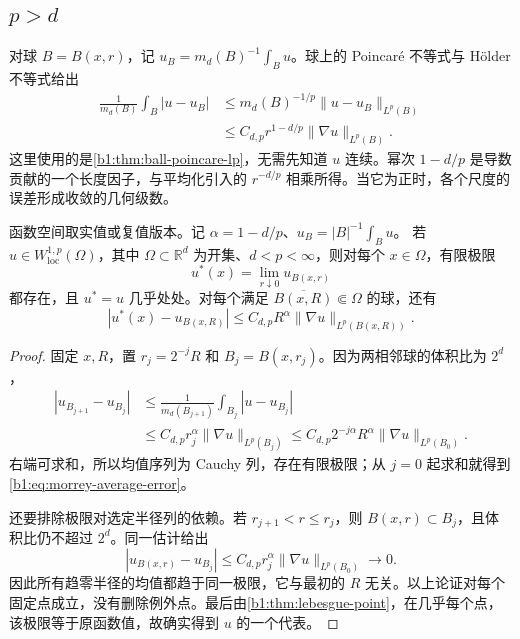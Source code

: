 \subsection{\texorpdfstring{\(p>d\)}{p>d}}
\label{b1:subsec:240301}

对球 \(B=B(x,r)\)，记 \(u_B=m_d(B)^{-1}\int_Bu\)。球上的 Poincaré 不等式与 Hölder 不等式给出
\begin{equation}\label{b1:eq:morrey-average-oscillation}
 \begin{split}
 \frac1{m_d(B)}\int_B|u-u_B|
 &\le m_d(B)^{-1/p}\|u-u_B\|_{L^p(B)}\\
 &\le C_{d,p}r^{1-d/p}\|\nabla u\|_{L^p(B)}.
 \end{split}
\end{equation}
这里使用的是\cref{b1:thm:ball-poincare-lp}，无需先知道 \(u\) 连续。幂次 \(1-d/p\) 是导数贡献的一个长度因子，与平均化引入的 \(r^{-d/p}\) 相乘所得。当它为正时，各个尺度的误差形成收敛的几何级数。

\begin{lemma}\label{b1:lem:morrey-ball-average-limit}
函数空间取实值或复值版本。记 \(\alpha=1-d/p\)、\(u_{B}=|B|^{-1}\int_Bu\)。
若 \(u\in W^{1,p}_{\mathrm{loc}}(\Omega)\)，其中 \(\Omega\subset\mathbb R^d\) 为开集、\(d<p<\infty\)，则对每个 \(x\in\Omega\)，有限极限
\[
 u^*(x)=\lim_{r\downarrow0}u_{B(x,r)}
\]
都存在，且 \(u^*=u\) 几乎处处。对每个满足 \(\overline{B(x,R)}\Subset\Omega\) 的球，还有
\begin{equation}\label{b1:eq:morrey-average-error}
 |u^*(x)-u_{B(x,R)}|
 \le C_{d,p}R^\alpha\|\nabla u\|_{L^p(B(x,R))}.
\end{equation}
\end{lemma}
\begin{proof}
固定 \(x,R\)，置 \(r_j=2^{-j}R\) 和 \(B_j=B(x,r_j)\)。因为两相邻球的体积比为 \(2^d\)，
\[
 \begin{split}
 |u_{B_{j+1}}-u_{B_j}|
 &\le\frac1{m_d(B_{j+1})}\int_{B_j}|u-u_{B_j}|\\
 &\le C_{d,p}r_j^\alpha\|\nabla u\|_{L^p(B_j)}
 \le C_{d,p}2^{-j\alpha}R^\alpha
                         \|\nabla u\|_{L^p(B_0)}.
 \end{split}
\]
右端可求和，所以均值序列为 Cauchy 列，存在有限极限；从 \(j=0\) 起求和就得到\eqref{b1:eq:morrey-average-error}。

还要排除极限对选定半径列的依赖。若 \(r_{j+1}<r\le r_j\)，则 \(B(x,r)\subset B_j\)，且体积比仍不超过 \(2^d\)。同一估计给出
\[
 |u_{B(x,r)}-u_{B_j}|
 \le C_{d,p}r_j^\alpha\|\nabla u\|_{L^p(B_0)}
 \longrightarrow0.
\]
因此所有趋零半径的均值都趋于同一极限，它与最初的 \(R\) 无关。以上论证对每个固定点成立，没有删除例外点。最后由\cref{b1:thm:lebesgue-point}，在几乎每个点，该极限等于原函数值，故确实得到 \(u\) 的一个代表。
\end{proof}

